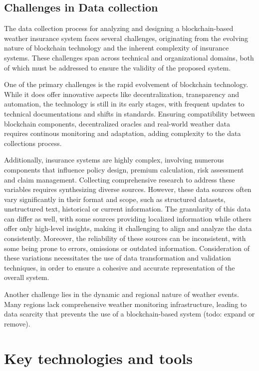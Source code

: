 \subsection{Challenges in Data collection}
The data collection process for analyzing and designing a blockchain-based weather insurance system faces several challenges, originating from the evolving nature of blockchain technology and the inherent complexity of insurance systems. These challenges span across technical and organizational domains, both of which must be addressed to ensure the validity of the proposed system.

One of the primary challenges is the rapid evolvement of blockchain technology. While it does offer innovative aspects like decentralization, transparency and automation, the technology is still in its early stages, with frequent updates to technical documentations and shifts in standards. Ensuring compatibility between blockchain components, decentralized oracles and real-world weather data requires continous monitoring and adaptation, adding complexity to the data collections process.

Additionally, insurance systems are highly complex, involving numerous components that influence policy design, premium calculation, risk assessment and claim management. Collecting comprehensive research to address these variables requires synthesizing diverse sources. However, these data sources often vary significantly in their format and scope, such as structured datasets, unstructured text, historical or current information. The granularity of this data can differ as well, with some sources providing localized information while others offer only high-level insights, making it challenging to align and analyze the data consistently. Moreover, the reliability of these sources can be inconsistent, with some being prone to errors, omissions or outdated information. Consideration of these variations necessitates the use of data transformation and validation techniques, in order to ensure a cohesive and accurate representation of the overall system.

Another challenge lies in the dynamic and regional nature of weather events. Many regions lack comprehensive weather monitoring infrastructure, leading to data scarcity that prevents the use of a blockchain-based system (todo: expand or remove).

\section{Key technologies and tools}\label{section:prototype_development}

